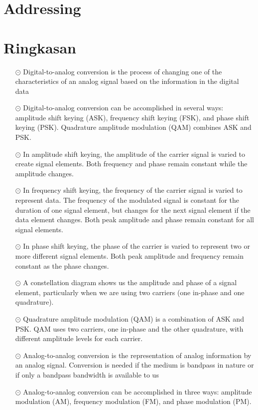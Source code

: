 \section{Addressing}


\section{Ringkasan}
\begin{itemize}
  \item[$\odot$] Digital-to-analog conversion is the process of changing one of the characteristics of an analog signal based on the information in the digital data
  \item[$\odot$] Digital-to-analog conversion can be accomplished in several ways: amplitude shift keying (ASK), frequency shift keying (FSK), and phase shift keying (PSK). Quadrature amplitude modulation (QAM) combines ASK and PSK.
  \item[$\odot$] In amplitude shift keying, the amplitude of the carrier signal is varied to create signal elements. Both frequency and phase remain constant while the amplitude changes.
  \item[$\odot$] In frequency shift keying, the frequency of the carrier signal is varied to represent data. The frequency of the modulated signal is constant for the duration of one signal element, but changes for the next signal element if the data element changes. Both peak amplitude and phase remain constant for all signal elements.
  \item[$\odot$] In phase shift keying, the phase of the carrier is varied to represent two or more different signal elements. Both peak amplitude and frequency remain constant as the phase changes.
  \item[$\odot$] A constellation diagram shows us the amplitude and phase of a signal element, particularly when we are using two carriers (one in-phase and one quadrature).
  \item[$\odot$] Quadrature amplitude modulation (QAM) is a combination of ASK and PSK. QAM uses two carriers, one in-phase and the other quadrature, with different amplitude levels for each carrier.
  \item[$\odot$] Analog-to-analog conversion is the representation of analog information by an analog signal. Conversion is needed if the medium is bandpass in nature or if only a bandpass bandwidth is available to us
  \item[$\odot$] Analog-to-analog conversion can be accomplished in three ways: amplitude modulation (AM), frequency modulation (FM), and phase modulation (PM).

\end{itemize}
